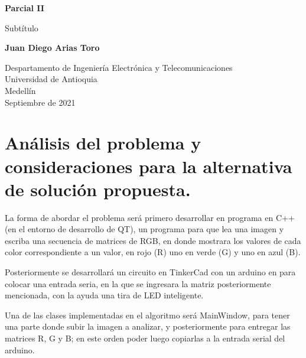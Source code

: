 \documentclass{article}
\begin{document}
\begin{titlepage}
    \begin{center}
        \vspace*{1cm}
            
        \Huge
        \textbf{Parcial II}
            
        \vspace{0.5cm}
        \LARGE
        Subtítulo
            
        \vspace{1.5cm}
            
        \textbf{Juan Diego Arias Toro}
            
        \vfill
            
        \vspace{0.8cm}
            
        \Large
        Despartamento de Ingeniería Electrónica y Telecomunicaciones\\
        Universidad de Antioquia\\
        Medellín\\
        Septiembre de 2021
            
    \end{center}
\end{titlepage}

\tableofcontents
\newpage
\section{Análisis del problema y consideraciones para la alternativa de solución propuesta.}\label{intro}
La forma de abordar el problema será primero desarrollar en programa en C++ (en el entorno de desarrollo de QT), un programa para que lea una imagen y escriba una secuencia de matrices de RGB, en donde mostrara los valores de cada color correspondiente a un valor, en rojo (R) uno en verde (G) y uno en azul (B).

Posteriormente se desarrollará un circuito en TinkerCad con un arduino en para colocar una entrada seria, en la que se ingresara la matriz posteriormente mencionada, con la ayuda una tira de LED inteligente.

Una de las clases implementadas en el algoritmo será MainWindow, para tener una parte donde subir la imagen a analizar, y posteriormente para entregar las matrices R, G y B; en este orden poder luego copiarlas a la entrada serial del arduino. 
\end{document}
